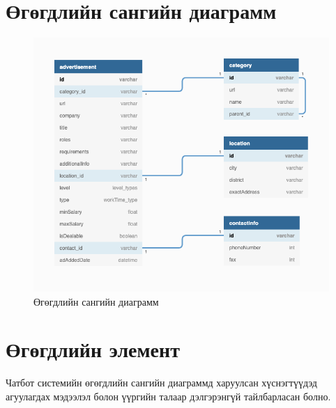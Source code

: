 \section{Өгөгдлийн сангийн диаграмм}
\begin{figure}[ht]
  \centering
  \includegraphics[width = \textwidth]{images/dbDiagram.png}
  \caption{Өгөгдлийн сангийн диаграмм}\label{fig:dbDiagram}
\end{figure}
\newpage

\section{Өгөгдлийн элемент}
Чатбот системийн өгөгдлийн сангийн диаграммд харуулсан хүснэгтүүдэд агуулагдах мэдээлэл болон үүргийн талаар дэлгэрэнгүй тайлбарласан болно. 
